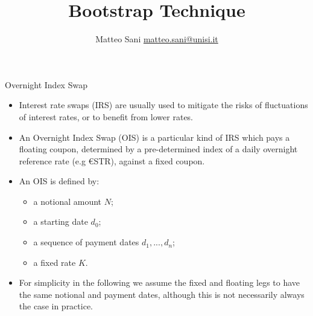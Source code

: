 \documentclass{beamer}
\title{Bootstrap Technique}
\author{Matteo Sani \href{mailto:matteo.sani@unisi.it}{matteo.sani@unisi.it}}
\begin{document}
\begin{frame}[plain]
  \maketitle
\end{frame}

\begin{frame}{Overnight Index Swap}
\begin{itemize}
\item Interest rate swaps (IRS) are usually used to mitigate the risks of fluctuations of interest rates, or to benefit from lower rates. 
\item An Overnight Index Swap (OIS) is a particular kind of IRS which pays a floating coupon, determined by a pre-determined index of a daily overnight reference rate (e.g €STR), against a fixed coupon.  
\item An OIS is defined by:
\begin{itemize}
  \item a notional amount $N$;
  \item a starting date $d_0$;
  \item a sequence of payment dates $d_1,...,d_n$;
  \item a fixed rate $K$.
\end{itemize}
\item For simplicity in the following we assume the fixed and floating legs to have the same notional and payment dates, although this is not necessarily always the case in practice.
\end{itemize}
\end{frame}
\end{document}
